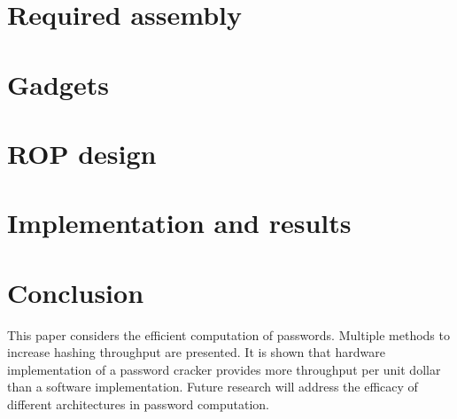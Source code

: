 \section{Required assembly} \label{sec::asm} %


\section{Gadgets} \label{sec::gadget} %


\section{ROP design}\label{sec::rop} %


\section{Implementation and results}\label{sec::results} %


\section{Conclusion}\label{sec::conclusion} 


	This paper considers the efficient computation of passwords. Multiple methods to increase hashing throughput are presented. It is shown that hardware implementation of a password cracker provides more throughput per unit dollar than a software implementation. Future research will address the efficacy of different architectures in password computation. 





